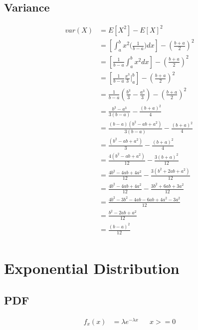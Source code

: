 \documentclass[]{article}
\begin{document}
\subsection{Variance}
\begin{align*}
var(X) &= E[X^2] - E[X]^2\\
&= [\int_{a}^{b} {x^2\big( \frac{1}{b-a} \big)dx}] - (\frac{b+a}{2})^2\\
&= [\frac{1}{b-a}\int_{a}^{b} {x^2dx}] - (\frac{b+a}{2})^2\\
&= [\frac{1}{b-a}\frac{x^3}{3}|_{a}^{b}] - (\frac{b+a}{2})^2\\
&= \frac{1}{b-a}(\frac{b^3}{3}-\frac{a^3}{3}) - (\frac{b+a}{2})^2\\
&= \frac{b^3-a^3}{3(b-a)} - \frac{(b+a)^2}{4}\\
&= \frac{(b-a)(b^2-ab+a^2)}{3(b-a)} - \frac{(b+a)^2}{4}\\
&= \frac{(b^2-ab+a^2)}{3} - \frac{(b+a)^2}{4}\\
&= \frac{4(b^2-ab+a^2)}{12} - \frac{3(b+a)^2}{12}\\
&= \frac{4b^2-4ab+4a^2}{12} - \frac{3(b^2+2ab+a^2)}{12}\\
&= \frac{4b^2-4ab+4a^2}{12} - \frac{3b^2+6ab+3a^2}{12}\\
&= \frac{4b^2-3b^2-4ab-6ab+4a^2-3a^2}{12}\\
&= \frac{b^2-2ab+a^2}{12}\\
&= \frac{(b-a)^2}{12}\\
\end{align*}

\pagebreak
\section {Exponential Distribution}

\subsection{PDF}
\begin{align*}
f_x(x) &= \lambda e^{-\lambda x} && x >= 0
\end{align*}
\end{document}
